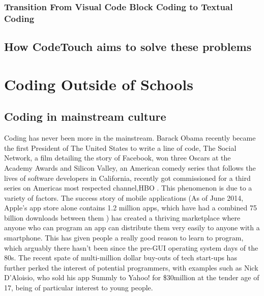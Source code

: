 \documentclass[ %
                    author={Jonathan Rankin},
                supervisor={Dr. David May, Dr. Ian Holyer},
                    degree={MEng},
                     title={CodeTouch},
                  subtitle={A Revolutionary Way To Program Real Code On Touch Screen Devices},
                      type={enterprise},
                      year={2015 } ]{dissertation}
\begin{document}
\subsubsection{Transition From Visual Code Block Coding to Textual Coding}



\subsection{How CodeTouch aims to solve these problems}





\section {Coding Outside of Schools}

\subsection{Coding in mainstream culture} %
Coding has never been more in the mainstream. Barack Obama recently became the first President of The United States to write a line of code\cite{Obama}, The Social Network, a film detailing the story of Facebook, won three Oscars at the Academy Awards \cite{socialNetwork} and Silicon Valley, an American comedy series that follows the lives of software developers in California, recently got commissioned for a third series \cite{thirdSeries} on Americas most respected channel,HBO \cite{HBO}. This phenomenon is due to a variety of factors. The success story of mobile applications (As of June 2014, Apple's app store alone contains 1.2 million apps, which have had a combined 75 billion downloads between them \cite{apple75}) has created a thriving marketplace where anyone who can program an app can distribute them very easily to anyone with a smartphone. This has given people a really good reason to learn to program, which arguably there hasn't been since the pre-GUI operating system days of the 80s. The recent spate of multi-million dollar buy-outs of tech start-ups has further perked the interest of potential programmers, with examples such as Nick D'Aloisio, who sold his app Summly to Yahoo! for \$30million at the tender age of 17\cite{summly}, being of particular interest to young people. 
\end{document}
